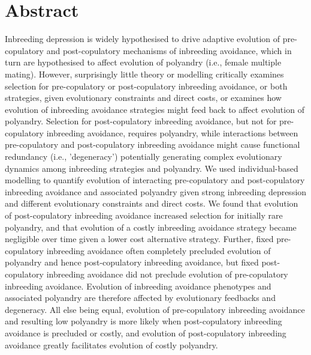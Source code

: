 \documentclass[10pt,letterpaper]{article}
\begin{document}
\section*{Abstract}
Inbreeding depression is widely hypothesised to drive adaptive evolution of pre-copulatory and post-copulatory mechanisms of inbreeding avoidance, which in turn are hypothesised to affect evolution of polyandry (i.e., female multiple mating). However, surprisingly little theory or modelling critically examines selection for pre-copulatory or post-copulatory inbreeding avoidance, or both strategies, given evolutionary constraints and direct costs, or examines how evolution of inbreeding avoidance strategies might feed back to affect evolution of polyandry. Selection for post-copulatory inbreeding avoidance, but not for pre-copulatory inbreeding avoidance, requires polyandry, while interactions between pre-copulatory and post-copulatory inbreeding avoidance might cause functional redundancy (i.e., 'degeneracy') potentially generating complex evolutionary dynamics among inbreeding strategies and polyandry. We used individual-based modelling to quantify evolution of interacting pre-copulatory and post-copulatory inbreeding avoidance and associated polyandry given strong inbreeding depression and different evolutionary constraints and direct costs. We found that evolution of post-copulatory inbreeding avoidance increased selection for initially rare polyandry, and that evolution of a costly inbreeding avoidance strategy became negligible over time given a lower cost alternative strategy. Further, fixed pre-copulatory inbreeding avoidance often completely precluded evolution of polyandry and hence post-copulatory inbreeding avoidance, but fixed post-copulatory inbreeding avoidance did not preclude evolution of pre-copulatory inbreeding avoidance. Evolution of inbreeding avoidance phenotypes and associated polyandry are therefore affected by evolutionary feedbacks and degeneracy. All else being equal, evolution of pre-copulatory inbreeding avoidance and resulting low polyandry is more likely when post-copulatory inbreeding avoidance is precluded or costly, and evolution of post-copulatory inbreeding avoidance greatly facilitates evolution of costly polyandry.
\end{document}
